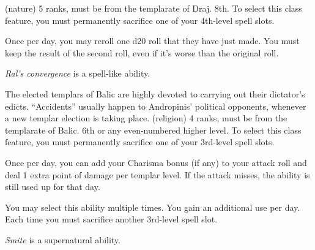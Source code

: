 { (nature) 5 ranks, must be from the templarate of Draj.}
{8th.}
{To select this class feature, you must permanently sacrifice one of your 4th-level spell slots.}
{
	Once per day, you may reroll one d20 roll that they have just made. You must keep the result of the second roll, even if it's worse than the original roll.

	\emph{Ral's convergence} is a spell-like ability.
}
{The elected templars of Balic are highly devoted to carrying out their dictator's edicts. ``Accidents'' usually happen to Andropinis' political opponents, whenever a new templar election is taking place.}
{ (religion) 4 ranks, must be from the templarate of Balic.}
{6th or any even-numbered higher level.}
{To select this class feature, you must permanently sacrifice one of your 3rd-level spell slots.}
{
	Once per day, you can add your Charisma bonus (if any) to your attack roll and deal 1 extra point of damage per templar level. If the attack misses, the ability is still used up for that day.

	You may select this ability multiple times. You gain an additional use per day. Each time you must sacrifice another 3rd-level spell slot.

	\emph{Smite} is a supernatural ability.
}





